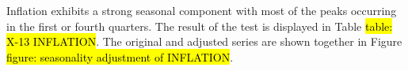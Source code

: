 Inflation exhibits a strong seasonal component with most of the peaks occurring in the first or fourth quarters. The result of the test is displayed in Table \hl{table: X-13 INFLATION}. The original and adjusted series are shown together in Figure \hl{figure: seasonality adjustment of INFLATION}.